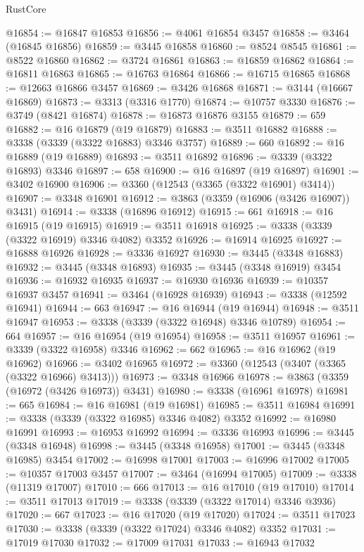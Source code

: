 \begin{lexlean}{RustCore}
\begin{coremodule}
@16854 := @16847 @16853
@16856 := @4061 @16854 @3457
@16858 := @3464 (@16845 @16856)
@16859 := @3445 @16858
@16860 := @8524 @8545
@16861 := @8522 @16860
@16862 := @3724 @16861
@16863 := @16859 @16862
@16864 := @16811 @16863
@16865 := @16763 @16864
@16866 := @16715 @16865
@16868 := @12663 @16866 @3457
@16869 := @3426 @16868
@16871 := @3144 (@16667 @16869)
@16873 := @3313 (@3316 @1770)
@16874 := @10757 @3330
@16876 := @3749 (@8421 @16874)
@16878 := @16873 @16876 @3155
@16879 := 659
@16882 := @16 @16879 (@19 @16879)
@16883 := @3511 @16882
@16888 := @3338 (@3339 (@3322 @16883) @3346 @3757)
@16889 := 660
@16892 := @16 @16889 (@19 @16889)
@16893 := @3511 @16892
@16896 := @3339 (@3322 @16893) @3346
@16897 := 658
@16900 := @16 @16897 (@19 @16897)
@16901 := @3402 @16900
@16906 := @3360 (@12543 (@3365 (@3322 @16901) @3414))
@16907 := @3348 @16901
@16912 := @3863 (@3359 (@16906 (@3426 @16907)) @3431)
@16914 := @3338 (@16896 @16912)
@16915 := 661
@16918 := @16 @16915 (@19 @16915)
@16919 := @3511 @16918
@16925 := @3338 (@3339 (@3322 @16919) @3346 @4082) @3352
@16926 := @16914 @16925
@16927 := @16888 @16926
@16928 := @3336 @16927
@16930 := @3445 (@3348 @16883)
@16932 := @3445 (@3348 @16893)
@16935 := @3445 (@3348 @16919) @3454
@16936 := @16932 @16935
@16937 := @16930 @16936
@16939 := @10357 @16937 @3457
@16941 := @3464 (@16928 @16939)
@16943 := @3338 (@12592 @16941)
@16944 := 663
@16947 := @16 @16944 (@19 @16944)
@16948 := @3511 @16947
@16953 := @3338 (@3339 (@3322 @16948) @3346 @10789)
@16954 := 664
@16957 := @16 @16954 (@19 @16954)
@16958 := @3511 @16957
@16961 := @3339 (@3322 @16958) @3346
@16962 := 662
@16965 := @16 @16962 (@19 @16962)
@16966 := @3402 @16965
@16972 := @3360 (@12543 (@3407 (@3365 (@3322 @16966) @3413)))
@16973 := @3348 @16966
@16978 := @3863 (@3359 (@16972 (@3426 @16973)) @3431)
@16980 := @3338 (@16961 @16978)
@16981 := 665
@16984 := @16 @16981 (@19 @16981)
@16985 := @3511 @16984
@16991 := @3338 (@3339 (@3322 @16985) @3346 @4082) @3352
@16992 := @16980 @16991
@16993 := @16953 @16992
@16994 := @3336 @16993
@16996 := @3445 (@3348 @16948)
@16998 := @3445 (@3348 @16958)
@17001 := @3445 (@3348 @16985) @3454
@17002 := @16998 @17001
@17003 := @16996 @17002
@17005 := @10357 @17003 @3457
@17007 := @3464 (@16994 @17005)
@17009 := @3338 (@11319 @17007)
@17010 := 666
@17013 := @16 @17010 (@19 @17010)
@17014 := @3511 @17013
@17019 := @3338 (@3339 (@3322 @17014) @3346 @3936)
@17020 := 667
@17023 := @16 @17020 (@19 @17020)
@17024 := @3511 @17023
@17030 := @3338 (@3339 (@3322 @17024) @3346 @4082) @3352
@17031 := @17019 @17030
@17032 := @17009 @17031
@17033 := @16943 @17032

\end{coremodule}
\end{lexlean}

